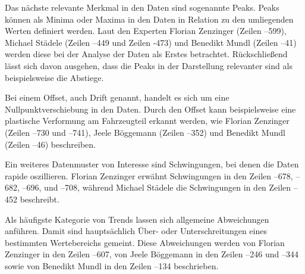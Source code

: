 Das nächste relevante Merkmal in den Daten sind sogenannte Peaks. Peaks können als Minima oder Maxima in den Daten in Relation zu den umliegenden Werten definiert werden. Laut den Experten Florian Zenzinger (Zeilen --599), Michael Städele (Zeilen --449 und Zeilen -473) und Benedikt Mundl (Zeilen --41) werden diese bei der Analyse der Daten als Erstes betrachtet. Rückschließend lässt sich davon ausgehen, dass die Peaks in der Darstellung relevanter sind als beispielsweise die Abstiege.

Bei einem Offset, auch Drift genannt, handelt es sich um eine Nullpunktverschiebung in den Daten. Durch den Offset kann beispielsweise eine plastische Verformung am Fahrzeugteil erkannt werden, wie Florian Zenzinger (Zeilen --730 und --741), Jeele Böggemann (Zeilen --352) und Benedikt Mundl (Zeilen --46) beschreiben.

Ein weiteres Datenmuster von Interesse sind Schwingungen, bei denen die Daten rapide oszillieren. Florian Zenzinger erwähnt Schwingungen in den Zeilen --678, --682, --696,  und --708, während Michael Städele die Schwingungen in den Zeilen --452 beschreibt.

Als häufigste Kategorie von Trends lassen sich allgemeine Abweichungen anführen. Damit sind hauptsächlich Über- oder Unterschreitungen eines bestimmten Wertebereichs gemeint. Diese Abweichungen werden von Florian Zenzinger in den Zeilen --607, von Jeele Böggemann in den Zeilen --246 und --344 sowie von Benedikt Mundl in den Zeilen --134 beschrieben.

